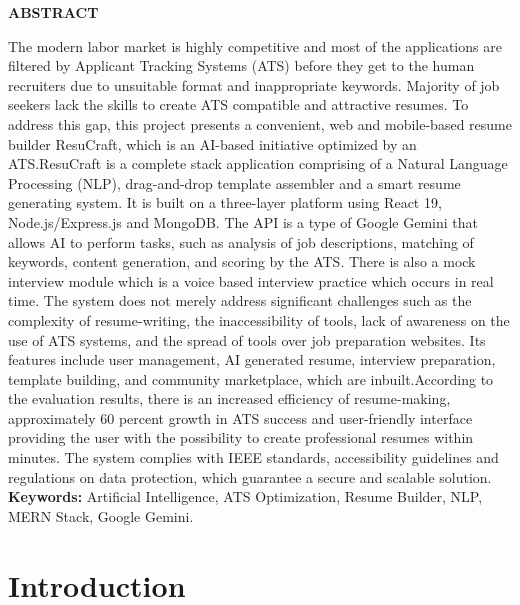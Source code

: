 \documentclass[12pt, a4paper, oneside]{report}
\begin{document}
\newpage
\begin{center}
  {\Large \textbf{ABSTRACT}}
\end{center}

The modern labor market is highly competitive and most of the applications are filtered by Applicant Tracking Systems (ATS) before they get to the human recruiters due to unsuitable format and inappropriate keywords. Majority of job seekers lack the skills to create ATS compatible and attractive resumes. To address this gap, this project presents a convenient, web and mobile-based resume builder ResuCraft, which is an AI-based initiative optimized by an ATS.ResuCraft is a complete stack application comprising of a Natural Language Processing (NLP), drag-and-drop template assembler and a smart resume generating system. It is built on a three-layer platform using React 19, Node.js/Express.js and MongoDB. The API is a type of Google Gemini that allows AI to perform tasks, such as analysis of job descriptions, matching of keywords, content generation, and scoring by the ATS. There is also a mock interview module which is a voice based interview practice which occurs in real time. The system does not merely address significant challenges such as the complexity of resume-writing, the inaccessibility of tools, lack of awareness on the use of ATS systems, and the spread of tools over job preparation websites. Its features include user management, AI generated resume, interview preparation, template building, and community marketplace, which are inbuilt.According to the evaluation results, there is an increased efficiency of resume-making, approximately 60 percent growth in ATS success and user-friendly interface providing the user with the possibility to create professional resumes within minutes. The system complies with IEEE standards, accessibility guidelines and regulations on data protection, which guarantee a secure and scalable solution.
\vspace{1cm}
\noindent\textbf{Keywords:} Artificial Intelligence, ATS Optimization, Resume Builder, NLP, MERN Stack, Google Gemini.

\chapter{Introduction}
\end{document}
